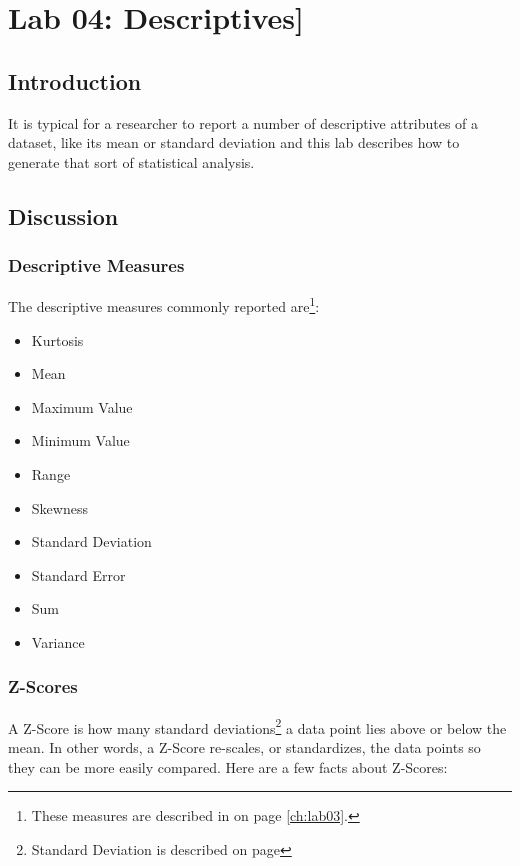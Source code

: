 \chapter{Lab 04: Descriptives]}\label{ch:lab04}

\section{Introduction}

It is typical for a researcher to report a number of descriptive attributes of a dataset, like its mean or standard deviation and this lab describes how to generate that sort of statistical analysis.

\section{Discussion}

\subsection{Descriptive Measures}

The descriptive measures commonly reported are\footnote{These measures are described in  on page \ref{ch:lab03}.}:

\begin{itemize}
  \item Kurtosis
  \item Mean
  \item Maximum Value
  \item Minimum Value
  \item Range
  \item Skewness
  \item Standard Deviation
  \item Standard Error
  \item Sum
  \item Variance
\end{itemize}

\subsection{Z-Scores}\label{z-scores}

A Z-Score is how many standard deviations\footnote{Standard Deviation is described on page \pageref{lab03_standard_deviation}} a data point lies above or below the mean. In other words, a Z-Score re-scales, or standardizes, the data points so they can be more easily compared. Here are a few facts about Z-Scores:

